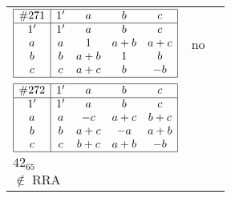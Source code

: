\documentclass[12pt]{article}
\newcommand\RRA{\operatorname{RRA}}
\newcommand\notRRA{\ensuremath{\notin \RRA}}
\newcommand{\join}{\mathbin{+}}%
\newcommand{\id}{{1'}}%
\renewcommand{\top}{1}%
\begin{document}
\begin{center}
\begin{longtable}{l|c|c}
$
\begin{array}{|c|cccc|} \hline
\#271 & \id & a & b & c \\ \hline
\id & \id & a & b & c \\
a & a & \top & a \join b & a \join c \\
b & b & a \join b & \top & b \\
c & c & a \join c & b & -b \\ \hline
\end{array}
$
 & no  
 & \adjustbox{valign=c, max height=1.6cm}{$
\left[ \begin{array}{ccccccc}
\id & a & a & b & c & b & c \\ 
a & \id & a & a & a & b & a \\ 
a & a & \id & b & c & b & c \\ 
b & a & b & \id & b & b & b \\ 
c & a & c & b & \id & b & c \\ 
b & b & b & b & b & \id & b \\ 
c & a & c & b & c & b & \id
\end{array}\right]
$}      \\[15mm]

$
\begin{array}{|c|cccc|} \hline
\#272 & \id & a & b & c \\ \hline
\id & \id & a & b & c \\
a & a & -c & a \join c & b \join c \\
b & b & a \join c & -a & a \join b \\
c & c & b \join c & a \join b & -b \\ \hline
\end{array}
$
 & \begin{tabular}{c} yes \\ $42_{65}$ \\ \notRRA \end{tabular} 
 & \adjustbox{valign=c, max height=1.6cm}{$
\left[ \begin{array}{cccccc}
\id & a & a & b & b & b \\ 
a & \id & a & a & c & c \\ 
a & a & \id & a & c & c \\ 
b & a & a & \id & b & b \\ 
b & c & c & b & \id & c \\ 
b & c & c & b & c & \id
\end{array}\right]
$}      \\[15mm]


\end{longtable}
\end{center}
\end{document}
